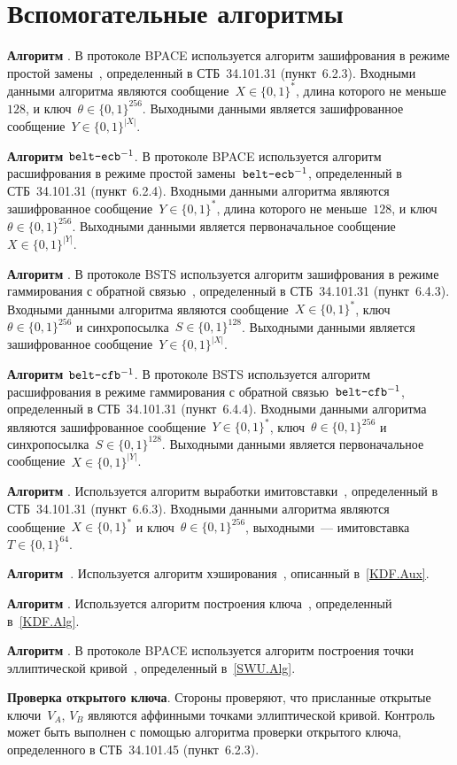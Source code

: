 \section{Вспомогательные алгоритмы}\label{AUX}

{\bf Алгоритм }.
В протоколе BPACE используется алгоритм зашифрования 
в режиме простой замены~,
определенный в СТБ~34.101.31 (пункт~6.2.3).
Входными данными алгоритма являются сообщение~$X\in\{0,1\}^*$, 
длина которого не меньше~$128$, и
ключ~$\theta\in\{0,1\}^{256}$.
Выходными данными является 
зашифрованное сообщение~$Y\in\{0,1\}^{|X|}$.

{\bf Алгоритм $\texttt{belt-ecb}^{-1}$}.
В протоколе BPACE используется алгоритм расшифрования 
в режиме простой замены~$\texttt{belt-ecb}^{-1}$, 
определенный в СТБ~34.101.31 (пункт~6.2.4).
Входными данными алгоритма являются 
зашифрованное сообщение~$Y\in\{0,1\}^*$, 
длина которого не меньше~$128$,
и ключ~$\theta\in\{0,1\}^{256}$.
Выходными данными является 
первоначальное сообщение~$X\in\{0,1\}^{|Y|}$.

{\bf Алгоритм }.
В протоколе BSTS используется алгоритм зашифрования 
в режиме гаммирования с обратной связью~,
определенный в СТБ~34.101.31 (пункт~6.4.3).
Входными данными алгоритма являются сообщение~$X\in\{0,1\}^*$, 
ключ~$\theta\in\{0,1\}^{256}$ и синхропосылка~$S\in\{0,1\}^{128}$.
Выходными данными является 
зашифрованное сообщение~$Y\in\{0,1\}^{|X|}$.

{\bf Алгоритм $\texttt{belt-cfb}^{-1}$}.
В протоколе BSTS используется алгоритм расшифрования 
в режиме гаммирования с обратной связью~$\texttt{belt-cfb}^{-1}$, 
определенный в СТБ~34.101.31 (пункт~6.4.4).
Входными данными алгоритма являются 
зашифрованное сообщение~$Y\in\{0,1\}^*$, 
ключ~$\theta\in\{0,1\}^{256}$ и синхропосылка~$S\in\{0,1\}^{128}$.
Выходными данными является 
первоначальное сообщение~$X\in\{0,1\}^{|Y|}$.

{\bf Алгоритм }.
Используется алгоритм выработки 
имитовставки~, 
определенный в СТБ~34.101.31 (пункт~6.6.3).
Входными данными алгоритма являются сообщение~$X\in\{0,1\}^*$
и ключ~$\theta\in\{0,1\}^{256}$,
выходными~--- имитовставка~$T\in\{0,1\}^{64}$.

{\bf Алгоритм~}.
Используется алгоритм хэширования~,
описанный в~\ref{KDF.Aux}.

{\bf Алгоритм }.
Используется алгоритм построения ключа~,
определенный в~\ref{KDF.Alg}.

{\bf Алгоритм }.
В протоколе BPACE используется алгоритм построения точки 
эллиптической кривой~,
определенный в~\ref{SWU.Alg}.

{\bf Проверка открытого ключа}.
Стороны проверяют, что присланные открытые 
ключи~$V_A$, $V_B$ являются аффинными точками эллиптической кривой.
Контроль может быть выполнен с помощью алгоритма
проверки открытого ключа, определенного в СТБ~34.101.45 
(пункт~6.2.3).


